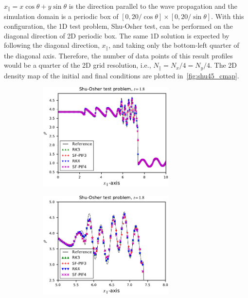 \( x_{\parallel} = x \cos{\theta} + y \sin{\theta} \) is the direction
parallel to the wave propagation and the simulation domain is a periodic box of
\( [0, 20/\cos{\theta}] \times [0, 20/\sin{\theta}] \).
With this configuration, the 1D test problem, Shu-Osher test,
can be performed on the diagonal direction of 2D periodic box.
The same 1D solution is expected by following the diagonal direction, \( x_{\parallel} \),
and taking only the bottom-left quarter of the diagonal axis.
Therefore, the number of data points of this result profiles
would be a quarter of the 2D grid resolution,
i.e., \( N_{\parallel} = N_{x}/4 = N_{y}/4 \).
The 2D density map of the initial and final conditions are plotted in~\cref{fig:shu45_cmap}.

\begin{figure}
    \centering
    \begin{subfigure}{\textwidth}
        \centering
        \includegraphics[width=0.75\textwidth]{fig/shu45_weno5_256}
    \end{subfigure}
    \par\bigskip
    \begin{subfigure}{\textwidth}
        \centering
        \includegraphics[width=0.75\textwidth]{fig/shu45_weno5_256_zoomed}

\end{subfigure}
\end{figure}

